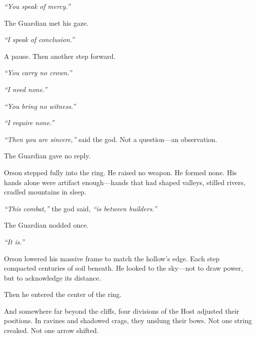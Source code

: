 \documentclass[12pt]{article}
\begin{document}
\vspace{0.5em}
\textit{``You speak of mercy.''}

\vspace{0.5em}
The Guardian met his gaze.

\vspace{0.5em}
\textit{``I speak of conclusion.''}

\vspace{0.5em}
A pause. Then another step forward.

\vspace{0.5em}
\textit{``You carry no crown.''}

\vspace{0.5em}
\textit{``I need none.''}

\vspace{0.5em}
\textit{``You bring no witness.''}

\vspace{0.5em}
\textit{``I require none.''}

\vspace{0.5em}
\textit{``Then you are sincere,''} said the god. Not a question---an observation.

\vspace{0.5em}
The Guardian gave no reply.

\vspace{0.5em}
Orson stepped fully into the ring. He raised no weapon. He formed none. His hands alone were artifact enough---hands that had shaped valleys, stilled rivers, cradled mountains in sleep.

\vspace{0.5em}
\textit{``This combat,''} the god said, \textit{``is between builders.''}

\vspace{0.5em}
The Guardian nodded once.

\vspace{0.5em}
\textit{``It is.''}

\vspace{0.5em}
Orson lowered his massive frame to match the hollow’s edge. Each step compacted centuries of soil beneath. He looked to the sky---not to draw power, but to acknowledge its distance.

\vspace{0.5em}
Then he entered the center of the ring.

\vspace{0.5em}
And somewhere far beyond the cliffs, four divisions of the Host adjusted their positions. In ravines and shadowed crags, they unslung their bows. Not one string creaked. Not one arrow shifted.
\end{document}
